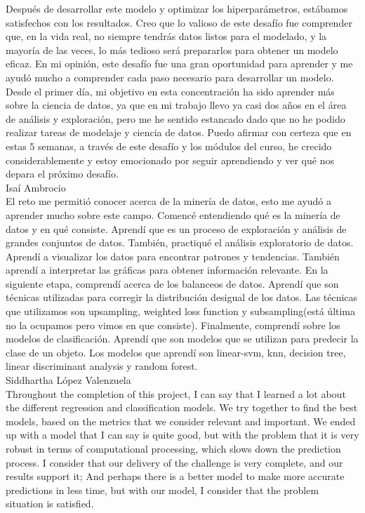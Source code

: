\documentclass{article}
\begin{document}
Después de desarrollar este modelo y optimizar los hiperparámetros,
 estábamos satisfechos con los resultados. Creo que lo valioso de este desafío fue comprender que, en la vida real,
  no siempre tendrás datos listos para el modelado, y la mayoría de las veces, lo más tedioso será prepararlos para obtener un
   modelo eficaz. En mi opinión, este desafío fue una gran oportunidad para aprender y me ayudó mucho a comprender cada paso
   necesario para desarrollar un modelo.\\

Desde el primer día, mi objetivo en esta concentración ha sido aprender más sobre la ciencia de datos, ya que en mi trabajo 
llevo ya casi dos años en el área de análisis y exploración, pero me he sentido estancado dado que no he podido realizar tareas 
de modelaje y ciencia de datos. Puedo afirmar con certeza que en estas 5 semanas, a través de este desafío y los módulos del curso,
 he crecido considerablemente y estoy emocionado por seguir aprendiendo y ver qué nos depara el próximo desafío.\\

Isaí Ambrocio\\
El reto me permitió conocer acerca de la minería de datos, esto me ayudó a aprender mucho sobre este campo. 
Comencé entendiendo qué es la minería de datos y en qué consiste. Aprendí que es un proceso de exploración y análisis
 de grandes conjuntos de datos. También, practiqué el análisis exploratorio de datos. 
 Aprendí a visualizar los datos para encontrar patrones y tendencias. También aprendí a interpretar las gráficas
  para obtener información relevante. En la siguiente etapa, comprendí acerca de los balanceos de datos. Aprendí que 
  son técnicas utilizadas para corregir la distribución desigual de los datos. Las técnicas que utilizamos son upsampling,
   weighted loss function y subsampling(está última no la ocupamos pero vimos en que consiste). Finalmente, comprendí 
   sobre los modelos de clasificación. Aprendí que son modelos que se utilizan para predecir la clase de un objeto. 
   Los modelos que aprendí son linear-svm, knn, decision tree, linear discriminant analysis y random forest. \\

Siddhartha López Valenzuela\\
Throughout the completion of this project, I can say that I learned a lot about the different regression and classification models.
 We try together to find the best models, based on the metrics that we consider relevant and important. We ended up with a model that
  I can say is quite good, but with the problem that it is very robust in terms of computational processing, which slows down the
  prediction process. I consider that our delivery of the challenge is very complete, and our results support it; And perhaps there
   is a better model to make more accurate predictions in less time, but with our model, I consider that the problem situation is 
   satisfied.

     



\end{document}
